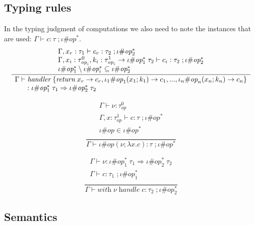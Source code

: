 \documentclass[12pt]{article}
\newcommand\eop[0]{\textit{op}}
\newcommand\inst[0]{\iota}
\newcommand\type[0]{\tau}
\newcommand\tarre[3]{#1 \rightarrow #2 \; #3}
\newcommand\thandler[4]{#1 \; #2 \Rightarrow #3 \; #4}
\newcommand\val[0]{\nu}
\newcommand\vhandler[1]{\textit{handler} \; \{#1\}}
\newcommand\comp[0]{c}
\newcommand\copi[5]{#1 \# #2(#3 ; \lambda #4 . #5)}
\newcommand\chandle[2]{\textit{with} \; #1 \; \textit{handle} \; #2}
\begin{document}
\subsection{Typing rules}
In the typing judgment of computations we also need to note the instances that are used: $\Gamma \vdash \comp : \type \; ; \inst\#\eop^*$. 
\[\frac{
	\begin{array}{l}
	\Gamma , x_r : \type_1 \vdash \comp_r : \type_2 \; ; \inst\#\eop^*_2 \\
	\Gamma , x_i : \type^0_{\eop_i} , k_i : \tarre{\type^1_{\eop_i}}{\inst\#\eop^*_1}{\type_2} \vdash \comp_i : \type_2 \; ; \inst\#\eop^*_2 \\
	\inst\#\eop^*_1 \setminus \inst\#\eop^*_i \subseteq \inst\#\eop^*_2 \\
	\end{array}
}{
	\begin{array}{l}
	\Gamma \vdash \vhandler{
		\textit{return} \; x_r \rightarrow \comp_r,
		\inst_1\#\eop_1 ( x_1 ; k_1 ) \rightarrow \comp_1,
		...,
		\inst_n\#\eop_n ( x_n ; k_n ) \rightarrow \comp_n
	} \\ \indent : \thandler{\inst\#\eop^*_1}{\type_1}{\inst\#\eop^*_2}{\type_2}
	\end{array}
}\]
\begin{minipage}{0.5\textwidth}
\[\frac{
	\begin{array}{l}
	\Gamma \vdash \val : \type^0_\eop \\
	\Gamma , x : \type^1_\eop \vdash \comp : \type \; ; \inst\#\eop^* \\
	\inst\#\eop \in \inst\#\eop^* \\
	\end{array}
}{
	\Gamma \vdash \copi{\inst}{\eop}{\val}{x}{\comp} : \type \; ; \inst\#\eop^*
}\]
\end{minipage}
\begin{minipage}{0.5\textwidth}
\[\frac{
	\begin{array}{l}
	\Gamma \vdash \val : \thandler{\inst\#\eop^*_1}{\type_1}{\inst\#\eop^*_2}{\type_2} \\
	\Gamma \vdash \comp : \type_1 \; ; \inst\#\eop^*_1 \\
	\end{array}
}{
	\Gamma \vdash \chandle{\val}{\comp} : \type_2 \; ; \inst\#\eop^*_2
}\]
\end{minipage}

\subsection{Semantics}
\end{document}
